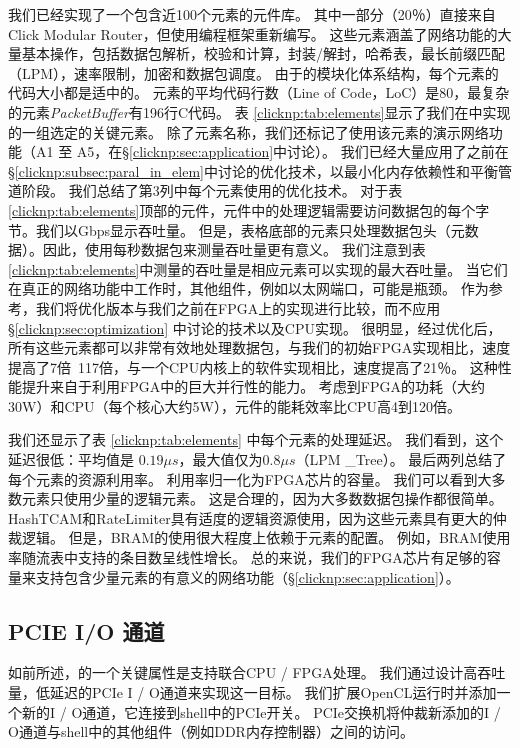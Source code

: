 我们已经实现了一个包含近100个元素的\name 元件库。
其中一部分（20％）直接来自Click Modular Router，但使用\name 编程框架重新编写。
这些元素涵盖了网络功能的大量基本操作，包括数据包解析，校验和计算，封装/解封，哈希表，最长前缀匹配（LPM），速率限制，加密和数据包调度。
由于\name 的模块化体系结构，每个元素的代码大小都是适中的。
元素的平均代码行数（Line of Code，LoC）是80，最复杂的元素\textit {PacketBuffer}有196行C代码。
表 \ref {clicknp:tab:elements}显示了我们在\name 中实现的一组选定的关键元素。
除了元素名称，我们还标记了使用该元素的演示网络功能（A1 至 A5，在\S \ref {clicknp:sec:application}中讨论）。
我们已经大量应用了之前在\S \ref {clicknp:subsec:paral_in_elem}中讨论的优化技术，以最小化内存依赖性和平衡管道阶段。
我们总结了第3列中每个元素使用的优化技术。
对于表 \ref {clicknp:tab:elements}顶部的元件，元件中的处理逻辑需要访问数据包的每个字节。我们以Gbps显示吞吐量。
但是，表格底部的元素只处理数据包头（元数据）。因此，使用每秒数据包来测量吞吐量更有意义。
我们注意到表 \ref {clicknp:tab:elements}中测量的吞吐量是相应元素可以实现的最大吞吐量。
当它们在真正的网络功能中工作时，其他组件，例如以太网端口，可能是瓶颈。
作为参考，我们将优化版本与我们之前在FPGA上的实现进行比较，而不应用\S \ref {clicknp:sec:optimization} 中讨论的技术以及CPU实现。
很明显，经过优化后，所有这些元素都可以非常有效地处理数据包，与我们的初始FPGA实现相比，速度提高了7倍~117倍，与一个CPU内核上的软件实现相比，速度提高了21％。
这种性能提升来自于利用FPGA中的巨大并行性的能力。
考虑到FPGA的功耗（大约30W）和CPU（每个核心大约5W），\name 元件的能耗效率比CPU高4到120倍。

我们还显示了表 \ref {clicknp:tab:elements} 中每个元素的处理延迟。
我们看到，这个延迟很低：平均值是 $0.19 \mu s$，最大值仅为$0.8 \mu s$（LPM \_Tree）。
最后两列总结了每个元素的资源利用率。 利用率归一化为FPGA芯片的容量。
我们可以看到大多数元素只使用少量的逻辑元素。
这是合理的，因为大多数数据包操作都很简单。
HashTCAM和RateLimiter具有适度的逻辑资源使用，因为这些元素具有更大的仲裁逻辑。
但是，BRAM的使用很大程度上依赖于元素的配置。 例如，BRAM使用率随流表中支持的条目数呈线性增长。
总的来说，我们的FPGA芯片有足够的容量来支持包含少量元素的有意义的网络功能（\S \ref{clicknp:sec:application}）。



\subsection{PCIE I/O 通道}
\label{clicknp:subsec:pcie}

如前所述，\name 的一个关键属性是支持联合CPU / FPGA处理。
我们通过设计高吞吐量，低延迟的PCIe I / O通道来实现这一目标。
我们扩展OpenCL运行时并添加一个新的I / O通道，它连接到shell中的PCIe开关。
PCIe交换机将仲裁新添加的I / O通道与shell中的其他组件（例如DDR内存控制器）之间的访问。

